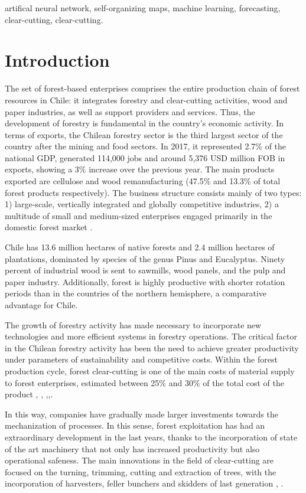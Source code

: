 \documentclass[conference]{IEEEtran}
\begin{document}
\begin{IEEEkeywords}
artifical neural network, self-organizing maps, machine learning, forecasting, clear-cutting, clear-cutting.
\end{IEEEkeywords}

\section{Introduction}

The set of forest-based enterprises comprises the entire production chain of forest resources in Chile: it integrates forestry and clear-cutting activities, wood and paper industries, as well as support providers and services. Thus, the development of forestry is fundamental in the country's economic activity. In terms of exports, the Chilean forestry sector is the third largest sector of the country after the mining and food sectors. In 2017, it represented 2.7\% of the national GDP, generated 114,000 jobs and around 5,376  USD million FOB in exports, showing a 3\% increase over the previous year. The main products exported are cellulose and wood remanufacturing (47.5\% and 13.3\% of total forest products respectively). The business structure consists mainly of two types: 1) large-scale, vertically integrated and globally competitive industries, 2) a multitude of small and medium-sized enterprises engaged primarily in the domestic forest market \cite{udec_2019}.

Chile has 13.6 million hectares of native forests and 2.4 million hectares of plantations, dominated by species of the genus Pinus and Eucalyptus. Ninety percent of industrial wood is sent to sawmills, wood panels, and the pulp and paper industry. Additionally, forest is highly productive with shorter rotation periods than in the countries of the northern hemisphere, a comparative advantage for Chile.

The growth of forestry activity has made necessary to incorporate new technologies and more efficient systems in forestry operations. The critical factor in the Chilean forestry activity has been the need to achieve greater productivity under parameters of sustainability and competitive costs. Within the forest production cycle, forest clear-cutting is one of the main costs of material supply to forest enterprises, estimated between 25\% and 30\% of the total cost of the product \cite{conrad_2018}, \cite{deli_2016}, \cite{jacovine_2005},\cite{Irigoyen_2002},\cite{largo_1996}.

In this way, companies have gradually made larger investments towards the mechanization of processes. In this sense, forest exploitation has had an extraordinary development in the last years, thanks to the incorporation of state of the art machinery that not only has increased productivity but also operational safeness. The main innovations in the field of clear-cutting are focused on the turning, trimming, cutting and extraction of trees, with the incorporation of harvesters, feller bunchers and skidders of last generation \cite{lignum_2002}, \cite{lignum_2004}.
\end{document}
